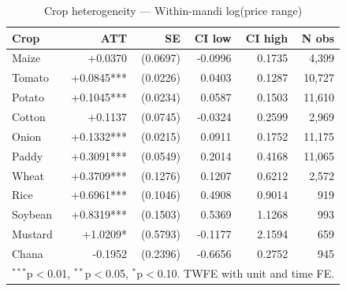 \begin{table}[htbp]
\centering
\caption{Crop heterogeneity — Within-mandi log(price range)}
\label{tab:spec1_within_mandi_crops}
\begin{tabular}{lrrrrr}
\hline\hline
Crop & ATT & SE & CI low & CI high & N obs \\
\hline
Maize & +0.0370 & (0.0697) & -0.0996 & 0.1735 & 4,399 \\
Tomato & +0.0845*** & (0.0226) & 0.0403 & 0.1287 & 10,727 \\
Potato & +0.1045*** & (0.0234) & 0.0587 & 0.1503 & 11,610 \\
Cotton & +0.1137 & (0.0745) & -0.0324 & 0.2599 & 2,969 \\
Onion & +0.1332*** & (0.0215) & 0.0911 & 0.1752 & 11,175 \\
Paddy & +0.3091*** & (0.0549) & 0.2014 & 0.4168 & 11,065 \\
Wheat & +0.3709*** & (0.1276) & 0.1207 & 0.6212 & 2,572 \\
Rice & +0.6961*** & (0.1046) & 0.4908 & 0.9014 & 919 \\
Soybean & +0.8319*** & (0.1503) & 0.5369 & 1.1268 & 993 \\
Mustard & +1.0209* & (0.5793) & -0.1177 & 2.1594 & 659 \\
Chana & -0.1952 & (0.2396) & -0.6656 & 0.2752 & 945 \\
\hline\hline
\multicolumn{6}{l}{\footnotesize $^{***}$p$<$0.01, $^{**}$p$<$0.05, $^{*}$p$<$0.10. TWFE with unit and time FE.} \\
\end{tabular}
\end{table}